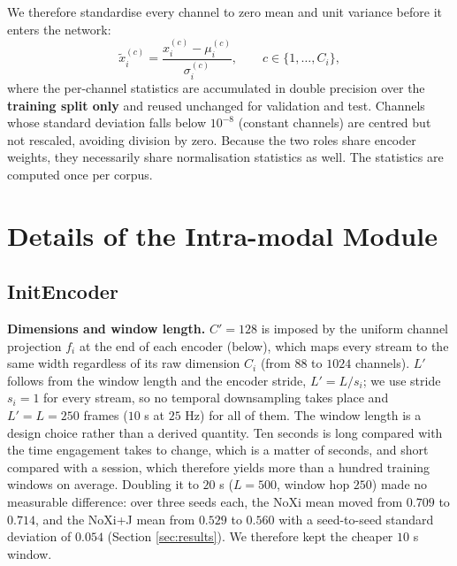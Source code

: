 \documentclass[10pt,a4paper,twocolumn]{article}
\begin{document}
	We therefore standardise every channel to zero mean and unit variance before it enters the network:
	$$\tilde{x}_{i}^{(c)} = \frac{x_{i}^{(c)} - \mu_{i}^{(c)}}{\sigma_{i}^{(c)}}, \qquad c \in \{1,\dots,C_i\},$$
	where the per-channel statistics are accumulated in double precision over the \textbf{training split only} and reused unchanged for validation and test. Channels whose standard deviation falls below $10^{-8}$ (constant channels) are centred but not rescaled, avoiding division by zero. Because the two roles share encoder weights, they necessarily share normalisation statistics as well. The statistics are computed once per corpus.


	\section{Details of the Intra-modal Module}
	\label{app:intra}
	\label{app:bimamba}
	\subsection*{InitEncoder}
	\textbf{Dimensions and window length.} $C' = 128$ is imposed by the uniform channel projection $f_i$ at the end of each encoder (below), which maps every stream to the same width regardless of its raw dimension $C_i$ (from $88$ to $1024$ channels). $L'$ follows from the window length and the encoder stride, $L' = L / s_i$; we use stride $s_i = 1$ for every stream, so no temporal downsampling takes place and $L' = L = 250$ frames ($10$ s at $25$ Hz) for all of them. The window length is a design choice rather than a derived quantity. Ten seconds is long compared with the time engagement takes to change, which is a matter of seconds, and short compared with a session, which therefore yields more than a hundred training windows on average. Doubling it to $20$ s ($L = 500$, window hop $250$) made no measurable difference: over three seeds each, the NoXi mean moved from $0.709$ to $0.714$, and the NoXi+J mean from $0.529$ to $0.560$ with a seed-to-seed standard deviation of $0.054$ (Section \ref{sec:results}). We therefore kept the cheaper $10$ s window.
\end{document}

